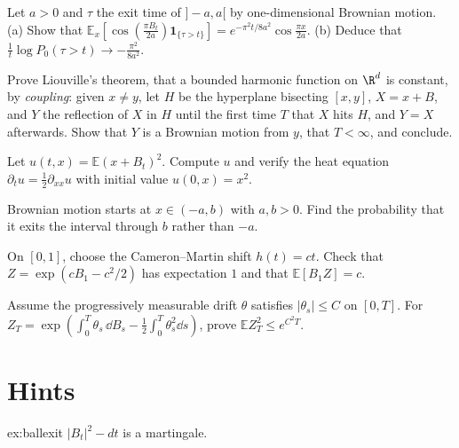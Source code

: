 \begin{exercise}[$\star\star$]\label{ex:strip}
Let $a>0$ and $\tau$ the exit time of $]-a,a[$ by one-dimensional Brownian motion. (a) Show that $\mathbb E_x[\cos(\frac{\pi B_t}{2a})\mathbf 1_{\{\tau>t\}}]=e^{-\pi^2t/8a^2}\cos\frac{\pi x}{2a}$. (b) Deduce that
$\frac1t\log P_0(\tau>t)\to-\frac{\pi^2}{8a^2}$.
\end{exercise}

\begin{exercise}[$\star\star\star$]\label{ex:liouville}
Prove Liouville's theorem, that a bounded harmonic function on $\R^d$ is constant, by \emph{coupling}: given $x\ne y$, let $H$ be the hyperplane bisecting $[x,y]$, $X=x+B$, and $Y$ the reflection of $X$ in $H$ until the first
time $T$ that $X$ hits $H$, and $Y=X$ afterwards. Show that $Y$ is a Brownian motion from $y$, that $T<\infty$, and conclude.
\end{exercise}

\begin{exercise}[$\star$]\label{ex:v12heatmoment}
Let $u(t,x)=\mathbb E(x+B_t)^2$. Compute $u$ and verify the heat equation $\partial_tu=\frac12\partial_{xx}u$ with initial value $u(0,x)=x^2$.
\end{exercise}

\begin{exercise}[$\star$]\label{ex:v12exitlinear}
Brownian motion starts at $x\in(-a,b)$ with $a,b>0$. Find the probability that it exits the interval through $b$ rather than $-a$.
\end{exercise}

\begin{exercise}[$\star\star$]\label{ex:v12cmtilt}
On $[0,1]$, choose the Cameron--Martin shift $h(t)=ct$. Check that $Z=\exp(cB_1-c^2/2)$ has expectation $1$ and that $\mathbb E[B_1Z]=c$.
\end{exercise}

\begin{exercise}[$\star\star\star$]\label{ex:v12girsanovL2}
Assume the progressively measurable drift $\theta$ satisfies $|\theta_s|\le C$ on $[0,T]$. For $Z_T=\exp(\int_0^T\theta_s\,\dd B_s-\frac12\int_0^T\theta_s^2\dd s)$, prove $\mathbb EZ_T^2\le e^{C^2T}$.
\end{exercise}

\section{Hints}

\begin{hint}{ex:ballexit}
$|B_t|^2-dt$ is a martingale.
\end{hint}

